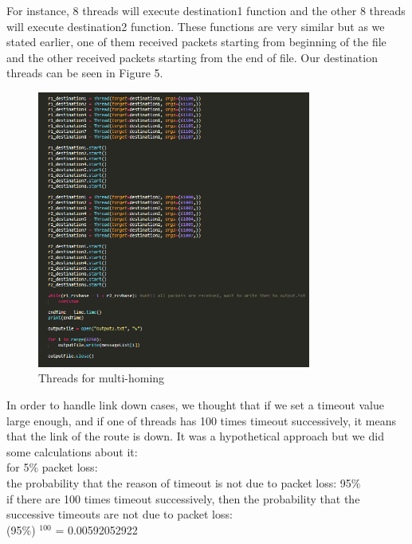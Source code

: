 \documentclass[conference]{IEEEtran}
\begin{document}
For instance, 8 threads will execute destination1 function and the other 8 threads will execute destination2 function. These functions are very similar but as we stated earlier, one of them received packets starting from beginning of the file and the other received packets starting from the end of file. Our destination threads can be seen in Figure 5. \\

\begin{figure}[htp]
    \centering
    \includegraphics[width=9cm]{multihoming2.png}
    \caption{Threads for multi-homing}
    \label{fig:graph}
\end{figure}


In order to handle link down cases, we thought that if we set a timeout value large enough, and if one of threads has 100 times timeout successively, it means that the link of the route is down. It was a hypothetical approach but we did some calculations about it: \\

for 5$\%$ packet loss:\\
the probability that the reason of timeout is not due to packet loss: 95$\%$ \\
if there are 100 times timeout successively, then the probability that the successive timeouts are not due to packet loss: \\
(95$\%$) $^{100}$ = 0.00592052922 \\
\end{document}
